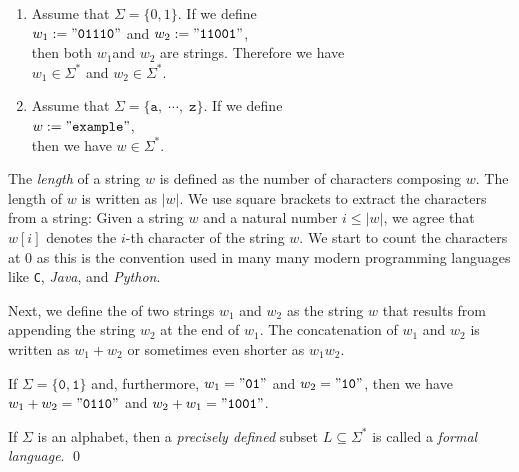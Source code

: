 \examplesEng
\begin{enumerate}
\item Assume that $\Sigma = \{0, 1\}$.  If we define
      \\[0.2cm]
      \hspace*{1.3cm}
      $w_1 := \mathtt{\symbol{34}01110\symbol{34}}$ \quad and \quad $w_2 := \mathtt{\symbol{34}11001\symbol{34}}$,
      \\[0.2cm]
      then both $w_1$and $w_2$ are strings.  Therefore we have
      \\[0.2cm]
      \hspace*{1.3cm}
      $w_1 \in \Sigma^*$ \quad and \quad $w_2 \in \Sigma^*$.
\item Assume that $\Sigma = \{\mathtt{a}, \;\cdots\!,\; \mathtt{z}\}$.   If we define
      \\[0.2cm]
      \hspace*{1.3cm}
      $w := \mathtt{\symbol{34}example}\symbol{34}$,
      \\[0.2cm]
      then we have $w \in \Sigma^*$. \eox
\end{enumerate}
The \emph{length} of a string $w$ is defined as the number of characters composing $w$.
The length of $w$ is written as $|w|$.    We use square brackets to extract the characters from a string:
Given a string $w$ and a natural number $i \leq |w|$, we agree that $w[i]$ denotes the $i$-th
character of the string $w$.   We start to count the characters at 0 as this is the convention used in many
many modern programming languages like \texttt{C}, \textsl{Java}, and \textsl{Python}.

Next, we define the   of two strings $w_1$ and $w_2$ as the string $w$ that
results from appending the string $w_2$ at the end of  $w_1$.  The concatenation of $w_1$ and $w_2$
is written as $w_1 + w_2$ or sometimes even shorter as $w_1w_2$.  
\vspace*{0.3cm}

\exampleEng
If $\Sigma = \{\mathtt{0},\mathtt{1}\}$ and, furthermore,  $w_1 = \mathtt{\symbol{34}01\symbol{34}}$ and $w_2 = \mathtt{\symbol{34}10\symbol{34}}$, then we have
\\[0.2cm]
\hspace*{1.3cm}
$w_1+w_2 = \mathtt{\symbol{34}0110\symbol{34}}$ \quad and \quad $w_2+w_1 = \mathtt{\symbol{34}1001\symbol{34}}$.  \eox

\begin{Definition} \hspace*{\fill} \linebreak
If $\Sigma$ is an alphabet, then a \emph{precisely defined} subset $L \subseteq \Sigma^*$
is called a \emph{formal language}.  \qed
\end{Definition}

